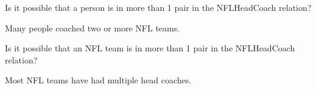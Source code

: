 \documentclass{ximera}
\begin{document}
\begin{exercise}
Is it possible that a person is in more than 1 pair in the NFLHeadCoach relation?

  \begin{multipleChoice}
  \end{multipleChoice}
  \begin{feedback}
Many people coached two or more NFL teams.
\end{feedback}
\end{exercise}



\begin{exercise}
Is it possible that an NFL team is in more than 1 pair in the NFLHeadCoach relation?

  \begin{multipleChoice}
  \end{multipleChoice}
  \begin{feedback}
Most NFL teams have had multiple head coaches.
\end{feedback}
\end{exercise}
\end{document}
